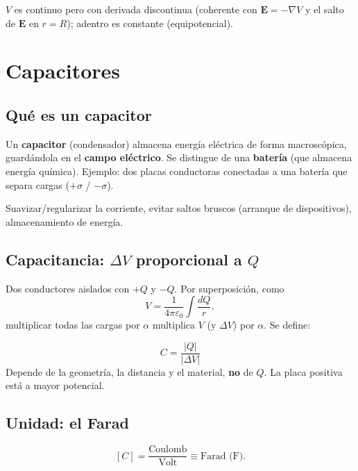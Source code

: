 \documentclass[12pt,a4paper]{article}
\begin{document}
$V$ es continuo pero con derivada discontinua (coherente con
$\mathbf{E}=-\nabla V$ y el salto de $\mathbf{E}$ en $r=R$); adentro es
constante (equipotencial).

\section{Capacitores}

\subsection{Qué es un capacitor}

Un \textbf{capacitor} (condensador) almacena energía eléctrica de forma
macroscópica, guardándola en el \textbf{campo eléctrico}. Se distingue de
una \textbf{batería} (que almacena energía química). Ejemplo: dos placas
conductoras conectadas a una batería que separa cargas ($+\sigma$ /
$-\sigma$).

\begin{notebox}[Usos]
  Suavizar/regularizar la corriente, evitar saltos bruscos (arranque de
  dispositivos), almacenamiento de energía.
\end{notebox}

\subsection{Capacitancia: $\Delta V$ proporcional a $Q$}

Dos conductores aislados con $+Q$ y $-Q$. Por superposición, como
\[
V = \frac{1}{4\pi\varepsilon_0}\int \frac{dQ}{r},
\]
multiplicar todas las cargas por $\alpha$ multiplica $V$ (y $\Delta V$)
por $\alpha$. Se define:

\begin{keybox}[Capacitancia]
  \[
  \boxed{C = \frac{|Q|}{|\Delta V|}}
  \]
  Depende de la geometría, la distancia y el material, \textbf{no} de
  $Q$. La placa positiva está a mayor potencial.
\end{keybox}

\subsection{Unidad: el Farad}

\[
[C] = \frac{\text{Coulomb}}{\text{Volt}} \equiv \text{Farad (F)}.
\]
\end{document}
